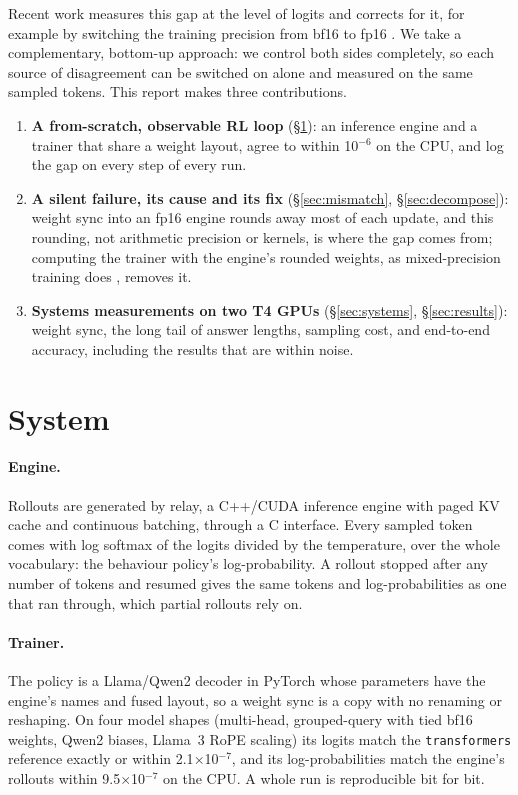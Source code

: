 \documentclass[11pt]{article}
\begin{document}
Recent work measures this gap at the level of logits and corrects for it, for example by
switching the training precision from bf16 to fp16 \citep{qi2025fp16}. We take a complementary,
bottom-up approach: we control both sides completely, so each source of disagreement can be
switched on alone and measured on the same sampled tokens. This report makes three contributions.

\begin{enumerate}
\item \textbf{A from-scratch, observable RL loop} (\S\ref{sec:system}): an inference engine and a
trainer that share a weight layout, agree to within 10$^{-6}$ on the CPU, and log the gap on every
step of every run.
\item \textbf{A silent failure, its cause and its fix} (\S\ref{sec:mismatch},
\S\ref{sec:decompose}): weight sync into an fp16 engine rounds away most of each update, and this
rounding, not arithmetic precision or kernels, is where the gap comes from; computing the trainer
with the engine's rounded weights, as mixed-precision training does \citep{micikevicius2017mixed},
removes it.
\item \textbf{Systems measurements on two T4 GPUs} (\S\ref{sec:systems}, \S\ref{sec:results}):
weight sync, the long tail of answer lengths, sampling cost, and end-to-end accuracy, including
the results that are within noise.
\end{enumerate}

\section{System}
\label{sec:system}

\paragraph{Engine.} Rollouts are generated by relay, a C++/CUDA inference engine with paged KV
cache and continuous batching, through a C interface. Every sampled token comes with log softmax
of the logits divided by the temperature, over the whole vocabulary: the behaviour policy's
log-probability. A rollout stopped after any number of tokens and resumed gives the same tokens
and log-probabilities as one that ran through, which partial rollouts rely on.

\paragraph{Trainer.} The policy is a Llama/Qwen2 decoder in PyTorch whose parameters have the
engine's names and fused layout, so a weight sync is a copy with no renaming or reshaping. On four
model shapes (multi-head, grouped-query with tied bf16 weights, Qwen2 biases, Llama~3 RoPE
scaling) its logits match the \texttt{transformers} reference exactly or within
2.1$\times$10$^{-7}$, and its log-probabilities match the engine's rollouts within
9.5$\times$10$^{-7}$ on the CPU. A whole run is reproducible bit for bit.
\end{document}
